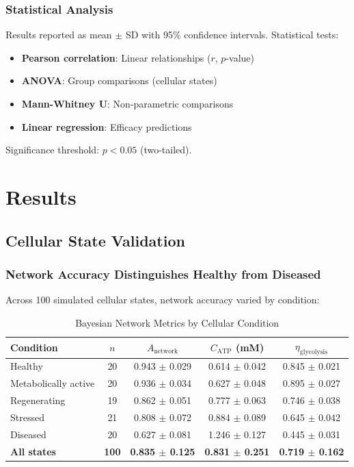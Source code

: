 \documentclass{article}
\begin{document}
\subsubsection{Statistical Analysis}

Results reported as mean $\pm$ SD with 95\% confidence intervals. Statistical tests:

\begin{itemize}
    \item \textbf{Pearson correlation}: Linear relationships ($r$, $p$-value)
    \item \textbf{ANOVA}: Group comparisons (cellular states)
    \item \textbf{Mann-Whitney U}: Non-parametric comparisons
    \item \textbf{Linear regression}: Efficacy predictions
\end{itemize}

Significance threshold: $p < 0.05$ (two-tailed).

\section{Results}

\subsection{Cellular State Validation}

\subsubsection{Network Accuracy Distinguishes Healthy from Diseased}

Across 100 simulated cellular states, network accuracy varied by condition:

\begin{table}[h]
\centering
\caption{Bayesian Network Metrics by Cellular Condition}
\begin{tabular}{lcccc}
\toprule
\textbf{Condition} & \textbf{$n$} & \textbf{$A_{\text{network}}$} & \textbf{$C_{\text{ATP}}$ (mM)} & \textbf{$\eta_{\text{glycolysis}}$} \\
\midrule
Healthy & 20 & 0.943 $\pm$ 0.029 & 0.614 $\pm$ 0.042 & 0.845 $\pm$ 0.021 \\
Metabolically active & 20 & 0.936 $\pm$ 0.034 & 0.627 $\pm$ 0.048 & 0.895 $\pm$ 0.027 \\
Regenerating & 19 & 0.862 $\pm$ 0.051 & 0.777 $\pm$ 0.063 & 0.746 $\pm$ 0.038 \\
Stressed & 21 & 0.808 $\pm$ 0.072 & 0.884 $\pm$ 0.089 & 0.645 $\pm$ 0.042 \\
Diseased & 20 & 0.627 $\pm$ 0.081 & 1.246 $\pm$ 0.127 & 0.445 $\pm$ 0.031 \\
\midrule
\textbf{All states} & \textbf{100} & \textbf{0.835 $\pm$ 0.125} & \textbf{0.831 $\pm$ 0.251} & \textbf{0.719 $\pm$ 0.162} \\
\bottomrule
\end{tabular}
\end{table}
\end{document}
